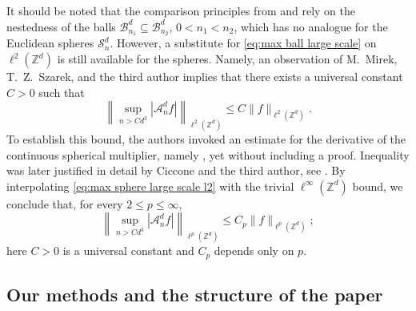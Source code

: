 \documentclass{article}
\newcommand{\Z}{\mathbb Z}
\theoremstyle{plain}
\numberwithin{equation}{section}
\begin{document}
It should be noted that the comparison principles from \cite[Theorem~1]{BMSWcubes} and \cite[Theorem~2]{BMSWperspective}
rely on the nestedness of the balls $\mathcal B_{n_1}^d\subseteq\mathcal B_{n_2}^d$, $0<n_1<n_2$, which has no analogue for the Euclidean spheres $\mathcal S_n^d$. However, a substitute for \eqref{eq:max ball large scale} on $\ell^2(\Z^d)$ is still available for the spheres. Namely, an observation of M.~Mirek, T.~Z.~Szarek, and the third author \cite[Remark~5.3, (5.19)]{MirekSzarekWrobelSpheres} implies that
there exists a universal constant $C>0$ such that
\begin{equation}
\label{eq:max sphere large scale l2}
 \left\|\sup_{n>Cd^3}|\mathcal A_n^df|\right\|_{\ell^2(\mathbb Z^d)}\leq C\|f\|_{\ell^2(\mathbb Z^d)}.
\end{equation}
To establish this bound, the authors invoked an estimate for the derivative of the continuous spherical multiplier, namely \cite[Remark~5.3, (5.20)]{MirekSzarekWrobelSpheres}, yet without including a proof. Inequality \cite[Remark~5.3, (5.20)]{MirekSzarekWrobelSpheres} was later justified in detail by Ciccone and the third author, see \cite[Proposition~5.3]{CicconeWrobel}.
By interpolating \eqref{eq:max sphere large scale l2} with the trivial $\ell^{\infty}(\Z^d)$ bound, we conclude that, for every $2\leq p\leq\infty$,
\begin{equation}
\label{eq:max sphere large scale}
 \left\|\sup_{n>Cd^3}|\mathcal A_n^df|\right\|_{\ell^p(\mathbb Z^d)}\leq C_p\|f\|_{\ell^p(\mathbb Z^d)};
\end{equation}
here $C>0$ is a universal constant and $C_p$ depends only on $p$.

\subsection{Our methods and the structure of the paper}
\end{document}
